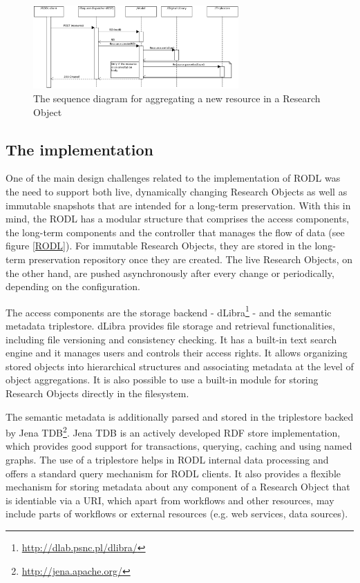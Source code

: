 \begin{figure}[!h]
\centering
\includegraphics[width=0.7\textwidth]{Figures/RODL/ResourceAdd.png}
\caption{The sequence diagram for aggregating a new resource in a Research Object}
\label{ResourceAdd}
\end{figure}

\subsection{The implementation}

One of the main design challenges related to the implementation of RODL was the need to support both live, dynamically changing Research Objects as well as immutable snapshots that are intended for a long-term preservation. With this in mind, the RODL has a modular structure that comprises the access components, the long-term components and the controller that manages the flow of data (see figure \ref{RODL}). For immutable Research Objects, they are stored in the long-term preservation repository once they are created. The live Research Objects, on the other hand, are pushed asynchronously after every change or periodically, depending on the configuration.


The access components are the storage backend - dLibra\footnote{\url{http://dlab.psnc.pl/dlibra/}} - and the semantic metadata triplestore. dLibra provides file storage and retrieval functionalities, including file versioning and consistency checking. It has a built-in text search engine and it manages users and controls their access rights. It allows organizing stored objects into hierarchical structures and associating metadata at the level of object aggregations. It is also possible to use a built-in module for storing Research Objects directly in the filesystem.

The semantic metadata is additionally parsed and stored in the triplestore backed by Jena TDB\footnote{\url{http://jena.apache.org/}}. Jena TDB is an actively developed RDF store implementation, which provides good support for transactions, querying, caching and using named graphs. The use of a triplestore helps in RODL internal data processing and offers a standard query mechanism for RODL clients. It also provides a flexible mechanism for storing metadata about any component of a Research Object that is identiable via a URI, which apart from workflows and other resources, may include parts of workflows or external resources (e.g. web services, data sources).


